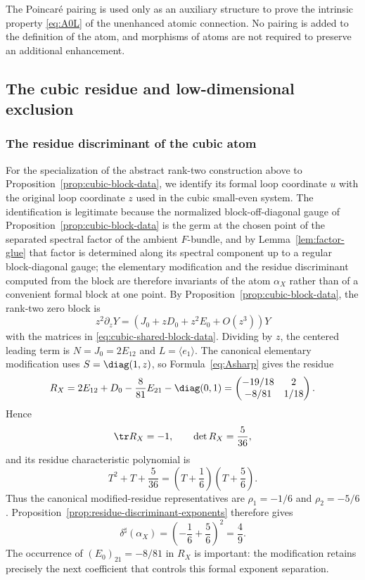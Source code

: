 \begin{remark}
The Poincar\'e pairing is used only as an auxiliary structure to prove the
intrinsic property \eqref{eq:A0L} of the unenhanced atomic connection.  No
pairing is added to the definition of the atom, and morphisms of atoms are
not required to preserve an additional enhancement.
\end{remark}


\subsection{The cubic residue and low-dimensional exclusion}

\subsubsection{The residue discriminant of the cubic atom}
For the specialization of the abstract rank-two construction above to
Proposition~\ref{prop:cubic-block-data}, we identify its formal loop
coordinate $u$ with the original loop coordinate $z$ used in the cubic
small-even system.  The identification is legitimate because the normalized
block-off-diagonal gauge of Proposition~\ref{prop:cubic-block-data} is the germ
at the chosen point of the separated spectral factor of the ambient
$F$-bundle, and by Lemma~\ref{lem:factor-glue} that factor is determined along
its spectral component up to a regular block-diagonal gauge; the elementary
modification and the residue discriminant computed from the block are therefore
invariants of the atom $\alpha_X$ rather than of a convenient formal block at
one point.  By Proposition~\ref{prop:cubic-block-data}, the
rank-two zero block is
\[
 z^2\partial_zY=(J_0+zD_0+z^2E_0+O(z^3))Y
\]
with the matrices in \eqref{eq:cubic-shared-block-data}.  Dividing by \(z\),
the centered leading term is \(N=J_0=2E_{12}\) and
\(L=\langle e_1\rangle\).  The canonical elementary modification uses
\(S=\diag(1,z)\), so Formula~\eqref{eq:Asharp} gives the residue
\begin{equation}\label{eq:RX}
 R_X
 =2E_{12}+D_0-\frac8{81}E_{21}-\diag(0,1)
 =\begin{pmatrix}
  -19/18&2\\
  -8/81&1/18
 \end{pmatrix}.
\end{equation}
Hence
\[
  \tr R_X=-1,\qquad \det R_X=\frac5{36},
\]
and its residue characteristic polynomial is
\[
 T^2+T+\frac5{36}
 =\left(T+\frac16\right)\left(T+\frac56\right).
\]
Thus the canonical modified-residue representatives are
$\rho_1=-1/6$ and $\rho_2=-5/6$.  Proposition~\ref{prop:residue-discriminant-exponents}
therefore gives
\begin{equation}\label{eq:cubic-delta}
 \boxed{\delta^\sharp(\alpha_X)
   =\left(-\frac16+\frac56\right)^2=\frac49.}
\end{equation}
The occurrence of \((E_0)_{21}=-8/81\) in \(R_X\) is important: the
modification retains precisely the next coefficient that controls this
formal exponent separation.

